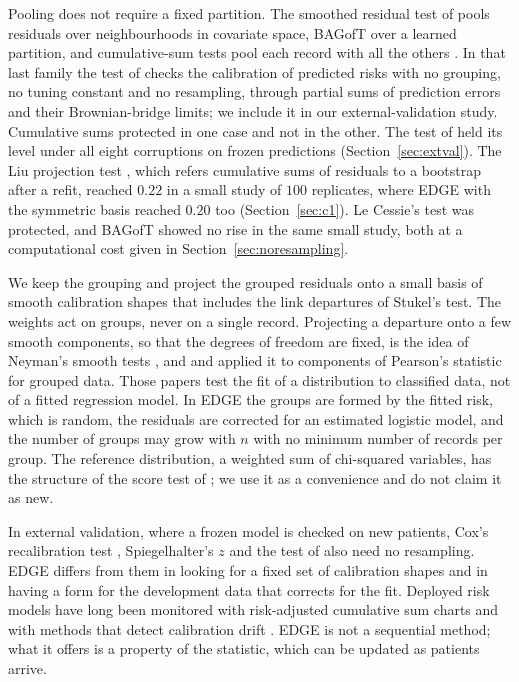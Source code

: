Pooling does not require a fixed partition. The smoothed residual test of \citet{le1991goodness} pools
residuals over neighbourhoods in covariate space, BAGofT over a learned partition, and cumulative-sum
tests pool each record with all the others \citep{suwei1991,lin2002cumulative}. In that last family
the test of \citet{sadatsafavi2024nonparametric} checks the calibration of predicted risks with no
grouping, no tuning constant and no resampling, through partial sums of prediction errors and their
Brownian-bridge limits; we include it in our external-validation study. Cumulative sums protected in
one case and not in the other. The test of \citeauthor{sadatsafavi2024nonparametric} held its level
under all eight corruptions on frozen predictions (Section~\ref{sec:extval}). The Liu projection test
\citep{liu2024comprehensive}, which refers cumulative sums of residuals to a bootstrap after a refit,
reached $0.22$ in a small study of $100$ replicates, where EDGE with the symmetric basis reached $0.20$
too (Section~\ref{sec:c1}). Le Cessie's test was protected, and BAGofT showed no rise in the same small
study, both at a computational cost given in Section~\ref{sec:noresampling}.

We keep the grouping and project the grouped residuals onto a small basis of smooth calibration
shapes that includes the link departures of Stukel's test. The weights act on groups, never on a
single record. Projecting a departure onto a few smooth components, so that the degrees of freedom are
fixed, is the idea of Neyman's smooth tests \citep{neyman1937,raynerthasbest2009}, and
\citet{rayner1985construction} and \citet{bestrayner1987grouped} applied it to components of Pearson's
statistic for grouped data. Those papers test the fit of a distribution to classified data, not of a
fitted regression model. In EDGE the groups are formed by the fitted risk, which is random, the
residuals are corrected for an estimated logistic model, and the number of groups may grow with $n$
with no minimum number of records per group. The reference distribution, a weighted sum of chi-squared
variables, has the structure of the score test of \citet{goeman2006testing}; we use it as a
convenience and do not claim it as new.

In external validation, where a frozen model is checked on new patients, Cox's recalibration test
\citep{cox1958}, Spiegelhalter's $z$ \citep{spiegelhalter1986probabilistic} and the test of
\citet{sadatsafavi2024nonparametric} also need no resampling. EDGE differs from them in looking for a
fixed set of calibration shapes and in having a form for the development data that corrects for the
fit. Deployed risk models have long been monitored with risk-adjusted cumulative sum charts
\citep{steiner2000cusum,grigg2004overview} and with methods that detect calibration drift
\citep{davis2020drift,feng2024monitoring}. EDGE is not a sequential method; what it offers is a
property of the statistic, which can be updated as patients arrive.

